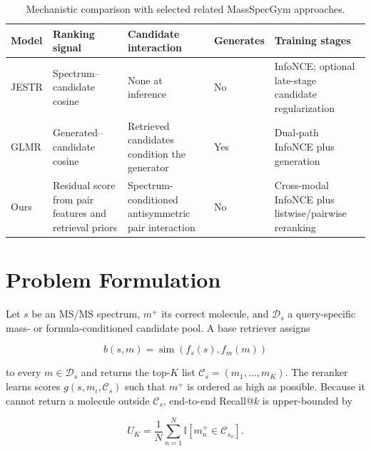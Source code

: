 \documentclass[runningheads]{llncs}
\newcommand{\candidates}{\mathcal{C}}
\begin{document}
\begin{table}[t]
  \centering
  \caption{Mechanistic comparison with selected related MassSpecGym approaches.}
  \label{tab:method_comparison}
  \footnotesize
  \begin{tabular}{>{\raggedright\arraybackslash}p{1.1cm}
                  >{\raggedright\arraybackslash}p{2.1cm}
                  >{\raggedright\arraybackslash}p{2.1cm}
                  >{\raggedright\arraybackslash}p{1.5cm}
                  >{\raggedright\arraybackslash}p{2.5cm}}
    \toprule
    Model & Ranking signal & Candidate interaction & Generates & Training stages \\
    \midrule
    JESTR & Spectrum--candidate cosine & None at inference & No
      & InfoNCE; optional late-stage candidate regularization \\
    GLMR & Generated--candidate cosine & Retrieved candidates condition the generator & Yes
      & Dual-path InfoNCE plus generation \\
    Ours & Residual score from pair features and retrieval priors
      & Spectrum-conditioned antisymmetric pair interaction & No
      & Cross-modal InfoNCE plus listwise/pairwise reranking \\
    \bottomrule
  \end{tabular}
\end{table}

\section{Problem Formulation}

Let $s$ be an MS/MS spectrum, $m^+$ its correct molecule, and
$\mathcal{D}_s$ a query-specific mass- or formula-conditioned candidate
pool. A base retriever assigns

\begin{equation}
  b(s,m) = \operatorname{sim}(f_s(s), f_m(m))
\end{equation}

to every $m\in\mathcal{D}_s$ and returns the top-$K$ list
$\candidates_s=(m_1,\ldots,m_K)$. The reranker learns scores
$g(s,m_i,\candidates_s)$ such that $m^+$ is ordered as high as possible.
Because it cannot return a molecule outside $\candidates_s$, end-to-end
Recall@$k$ is upper-bounded by

\begin{equation}
  U_K = \frac{1}{N}\sum_{n=1}^{N}
  \mathbb{I}[m_n^+\in\candidates_{s_n}].
  \label{eq:upper_bound}
\end{equation}
\end{document}
